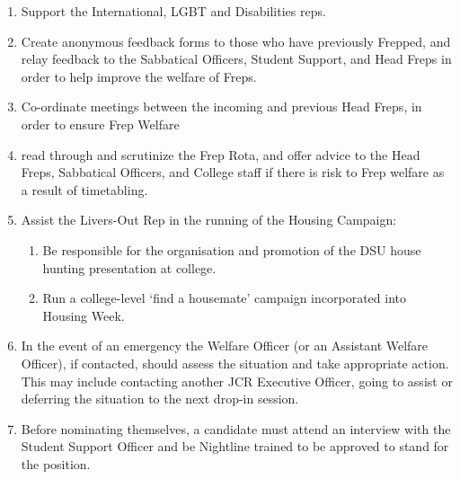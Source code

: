 \begin{enumerate}
    \item Support the International, LGBT and Disabilities reps.
    \item Create anonymous feedback forms to those who have previously Frepped, and relay feedback to the Sabbatical Officers, Student Support, and Head Freps in order to help improve the welfare of Freps.
    \item Co-ordinate meetings between the incoming and previous Head Freps, in order to ensure Frep Welfare
    \item read through and scrutinize the Frep Rota, and offer advice to the Head Freps, Sabbatical Officers, and College staff if there is risk to Frep welfare as a result of timetabling.
    \item Assist the Livers-Out Rep in the running of the Housing Campaign:
        \begin{enumerate}
            \item Be responsible for the organisation and promotion of the DSU house hunting presentation at college.
            \item Run a college-level ‘find a housemate’ campaign incorporated into Housing Week.
        \end{enumerate}
    \item In the event of an emergency the Welfare Officer (or an Assistant Welfare Officer), if contacted, should assess the situation and take appropriate action. This may include contacting another JCR Executive Officer, going to assist or deferring the situation to the next drop-in session. 
    \item Before nominating themselves, a candidate must attend an interview with the Student Support Officer and be Nightline trained to be approved to stand for the position.
\end{enumerate}

